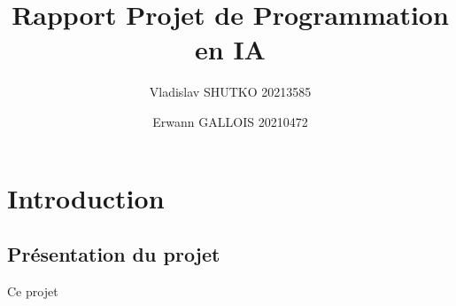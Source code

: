 \documentclass{article}
\title{Rapport Projet de Programmation en IA}
\author{Vladislav SHUTKO 20213585  \and Erwann GALLOIS 20210472}
\date{}
\begin{document}
\maketitle
\newpage
\tableofcontents
\newpage
\section{Introduction}
\subsection{Présentation du projet}
Ce projet 
\end{document}
